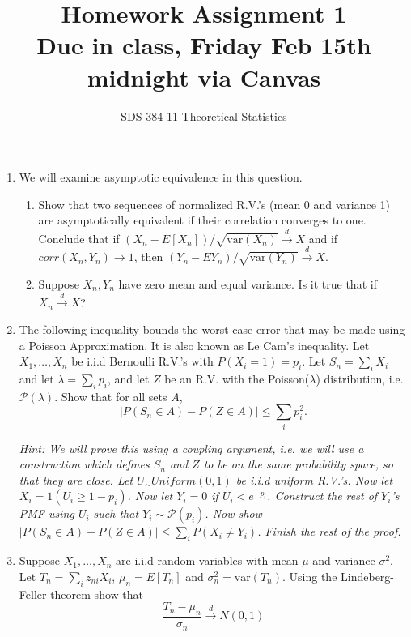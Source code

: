 \documentclass[11pt]{article}
\newcommand{\var}{\text{var}}
\newcommand{\cd}{\stackrel{d}{\rightarrow}}
\begin{document}
\title{{\bf Homework Assignment 1}\\Due in class, Friday Feb 15th midnight via Canvas}
\author{SDS 384-11 Theoretical Statistics}

\date{}

\maketitle{}
\begin{enumerate}%
\item We will examine asymptotic equivalence in this question. 
\begin{enumerate}
	\item Show that two sequences of normalized R.V.'s (mean 0 and variance 1) are asymptotically equivalent if their correlation converges to one. Conclude that if $(X_n-E[X_n])/\sqrt{\var(X_n)}\cd X$ and if $corr(X_n,Y_n)\rightarrow 1$, then $(Y_n-EY_n)/\sqrt{\var(Y_n)}\cd X$.
	\item Suppose $X_n,Y_n$ have zero mean and equal variance. Is it true that if $X_n\cd X$?
\end{enumerate}
\item The following inequality bounds the worst case error that may be made using a Poisson Approximation. It is also known as Le Cam's inequality. Let $X_1,\dots, X_n$ be i.i.d Bernoulli R.V.'s with $P(X_i=1)=p_i$. Let $S_n=\sum_i X_i$ and let $\lambda=\sum_i p_i$, and let $Z$ be an R.V. with the Poisson($\lambda$) distribution, i.e. $\mathcal{P}(\lambda)$. Show that for all sets $A$,
$$|P(S_n\in A)-P(Z\in A)|\leq \sum_i p_i^2.$$

\textit{Hint: We will prove this using a coupling argument, i.e. we will use a construction which defines $S_n$ and $Z$ to be on the same probability space, so that they are close. Let $U_\sim Uniform(0,1)$ be i.i.d uniform R.V.'s. Now let $X_i=1(U_i\geq 1-p_i)$. Now let $Y_i=0$ if $U_i< e^{-p_i} $. Construct the rest of $Y_i$'s PMF using $U_i$ such that $Y_i\sim \mathcal{P}(p_i)$. Now show $|P(S_n\in A)-P(Z\in A)|\leq \sum_i P(X_i\neq Y_i)$. Finish the rest of the proof.} 
\item Suppose $X_1,\dots, X_n$ are i.i.d random variables with mean $\mu$ and variance $\sigma^2$. Let $T_n=\sum_i z_{ni}X_i$, $\mu_n=E[T_n]$ and $\sigma_n^2=\var(T_n)$. Using the Lindeberg-Feller theorem show that 
$$\frac{T_n-\mu_n}{\sigma_n}\cd N(0,1)$$



\end{enumerate}
\end{document}
